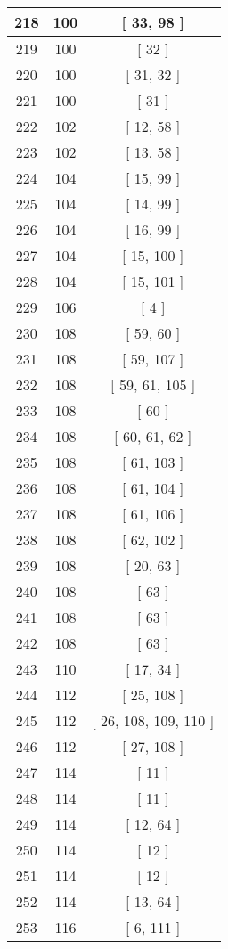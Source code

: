 \begin{center}
\begin{longtable}[H]{|| c c c ||}
\hline
218 & 100 & [ 33, 98 ] \\ 
\hline
219 & 100 & [ 32 ] \\ 
\hline
220 & 100 & [ 31, 32 ] \\ 
\hline
221 & 100 & [ 31 ] \\ 
\hline
222 & 102 & [ 12, 58 ] \\ 
\hline
223 & 102 & [ 13, 58 ] \\ 
\hline
224 & 104 & [ 15, 99 ] \\ 
\hline
225 & 104 & [ 14, 99 ] \\ 
\hline
226 & 104 & [ 16, 99 ] \\ 
\hline
227 & 104 & [ 15, 100 ] \\ 
\hline
228 & 104 & [ 15, 101 ] \\ 
\hline
229 & 106 & [ 4 ] \\ 
\hline
230 & 108 & [ 59, 60 ] \\ 
\hline
231 & 108 & [ 59, 107 ] \\ 
\hline
232 & 108 & [ 59, 61, 105 ] \\ 
\hline
233 & 108 & [ 60 ] \\ 
\hline
234 & 108 & [ 60, 61, 62 ] \\ 
\hline
235 & 108 & [ 61, 103 ] \\ 
\hline
236 & 108 & [ 61, 104 ] \\ 
\hline
237 & 108 & [ 61, 106 ] \\ 
\hline
238 & 108 & [ 62, 102 ] \\ 
\hline
239 & 108 & [ 20, 63 ] \\ 
\hline
240 & 108 & [ 63 ] \\ 
\hline
241 & 108 & [ 63 ] \\ 
\hline
242 & 108 & [ 63 ] \\ 
\hline
243 & 110 & [ 17, 34 ] \\ 
\hline
244 & 112 & [ 25, 108 ] \\ 
\hline
245 & 112 & [ 26, 108, 109, 110 ] \\ 
\hline
246 & 112 & [ 27, 108 ] \\ 
\hline
247 & 114 & [ 11 ] \\ 
\hline
248 & 114 & [ 11 ] \\ 
\hline
249 & 114 & [ 12, 64 ] \\ 
\hline
250 & 114 & [ 12 ] \\ 
\hline
251 & 114 & [ 12 ] \\ 
\hline
252 & 114 & [ 13, 64 ] \\ 
\hline
253 & 116 & [ 6, 111 ] \\ 

\end{longtable}
\end{center}
